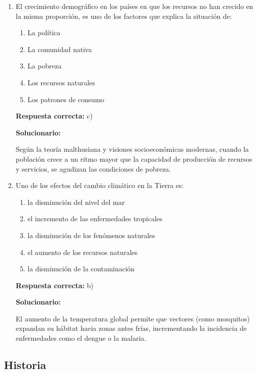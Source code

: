 \begin{enumerate}[resume]
	\item El crecimiento demográfico en los países en que los recursos no han crecido en la misma proporción, es uno de los factores que explica la situación de:
	\begin{enumerate}[label=\alph*)]
		\item La política
		\item La comunidad nativa
		\item La pobreza
		\item Los recursos naturales
		\item Los patrones de consumo
	\end{enumerate}
	\textbf{Respuesta correcta:} c)

	\vspace{2mm}
	\textbf{Solucionario:}

	Según la teoría malthusiana y visiones socioeconómicas modernas, cuando la población crece a un ritmo mayor que la capacidad de producción de recursos y servicios, se agudizan las condiciones de pobreza.

	\vspace{6mm}

	\item Uno de los efectos del cambio climático en la Tierra es:
	\begin{enumerate}[label=\alph*)]
		\item la disminución del nivel del mar
		\item el incremento de las enfermedades tropicales
		\item la disminución de los fenómenos naturales
		\item el aumento de los recursos naturales
		\item la disminución de la contaminación
	\end{enumerate}
	\textbf{Respuesta correcta:} b)

	\vspace{2mm}
	\textbf{Solucionario:}

	El aumento de la temperatura global permite que vectores (como mosquitos) expandan su hábitat hacia zonas antes frías, incrementando la incidencia de enfermedades como el dengue o la malaria.

	\vspace{6mm}
\end{enumerate}

\subsection*{Historia}

